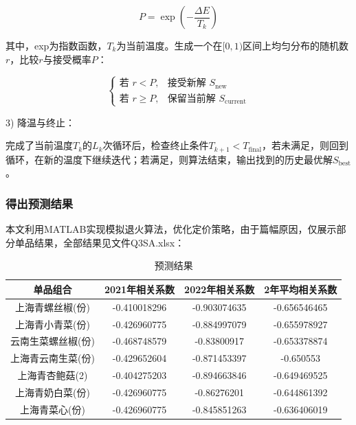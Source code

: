 \documentclass{article}
\begin{document}
	\begin{equation}
	P = \exp\left(-\frac{\Delta E}{T_k}\right)
	\end{equation}
	
	其中，exp为指数函数，\(T_k\)为当前温度。生成一个在\([0,1)\)区间上均匀分布的随机数\(r\)，比较\(r\)与接受概率\(P\)：
	
	\[
	\begin{cases}
		\text{若 } r < P, & \text{接受新解 } S_{\text{new}} \\
		\text{若 } r \geq P, & \text{保留当前解 } S_{\text{current}}
	\end{cases}
	\]
	
	3) 降温与终止：
	
	完成了当前温度\(T_k\)的\(L_k\)次循环后，检查终止条件\(T_{k+1} < T_{\text{final}}\)，若未满足，则回到循环，在新的温度下继续迭代；若满足，则算法结束，输出找到的历史最优解\(S_{\text{best}}\)。
	
	\subsubsection{得出预测结果}
	
	本文利用MATLAB实现模拟退火算法，优化定价策略，由于篇幅原因，仅展示部分单品结果，全部结果见文件Q3SA.xlsx：
	
	\begin{table}[htbp]
		\centering
		\renewcommand{\arraystretch}{1.5}
		\renewcommand{\heavyrulewidth}{1.2pt}
		\caption{预测结果}
		\begin{tabular}{cccc}
			\hline
			\textbf{单品组合} & \textbf{2021年相关系数} & \textbf{2022年相关系数} & \textbf{2年平均相关系数} \\
			\hline
			上海青螺丝椒(份) & -0.410018296 & -0.903074635 & -0.656546465 \\
			上海青小青菜(份) & -0.426960775 & -0.884997079 & -0.655978927 \\
			云南生菜螺丝椒(份) & -0.468748579 & -0.83800917 & -0.653378874 \\
			上海青云南生菜(份) & -0.429652604 & -0.871453397 & -0.650553 \\
			上海青杏鲍菇(2) & -0.404275203 & -0.894663846 & -0.649469525 \\
			上海青奶白菜(份) & -0.426960775 & -0.86276201 & -0.644861392 \\
			上海青菜心(份) & -0.426960775 & -0.845851263 & -0.636406019 \\
			\hline
		\end{tabular}
		\label{tab:prediction_results}
		\renewcommand{\heavyrulewidth}{0.8pt}
	\end{table}
	
	
	
\end{document}
